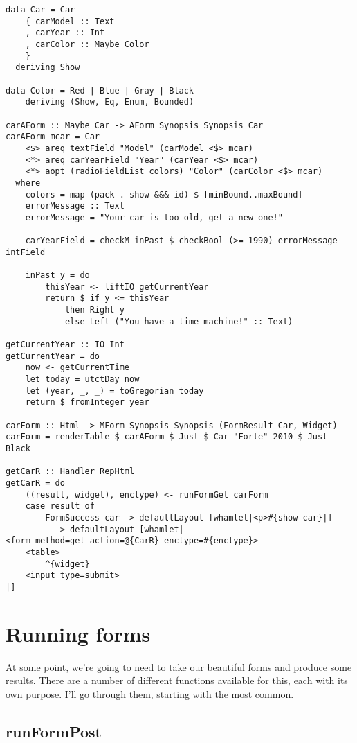 \begin{lstlisting}
data Car = Car
    { carModel :: Text
    , carYear :: Int
    , carColor :: Maybe Color
    }
  deriving Show

data Color = Red | Blue | Gray | Black
    deriving (Show, Eq, Enum, Bounded)

carAForm :: Maybe Car -> AForm Synopsis Synopsis Car
carAForm mcar = Car
    <$> areq textField "Model" (carModel <$> mcar)
    <*> areq carYearField "Year" (carYear <$> mcar)
    <*> aopt (radioFieldList colors) "Color" (carColor <$> mcar)
  where
    colors = map (pack . show &&& id) $ [minBound..maxBound]
    errorMessage :: Text
    errorMessage = "Your car is too old, get a new one!"

    carYearField = checkM inPast $ checkBool (>= 1990) errorMessage intField

    inPast y = do
        thisYear <- liftIO getCurrentYear
        return $ if y <= thisYear
            then Right y
            else Left ("You have a time machine!" :: Text)

getCurrentYear :: IO Int
getCurrentYear = do
    now <- getCurrentTime
    let today = utctDay now
    let (year, _, _) = toGregorian today
    return $ fromInteger year

carForm :: Html -> MForm Synopsis Synopsis (FormResult Car, Widget)
carForm = renderTable $ carAForm $ Just $ Car "Forte" 2010 $ Just Black

getCarR :: Handler RepHtml
getCarR = do
    ((result, widget), enctype) <- runFormGet carForm
    case result of
        FormSuccess car -> defaultLayout [whamlet|<p>#{show car}|]
        _ -> defaultLayout [whamlet|
<form method=get action=@{CarR} enctype=#{enctype}>
    <table>
        ^{widget}
    <input type=submit>
|]
\end{lstlisting}

\section{Running forms}

At some point, we're going to need to take our beautiful forms and produce some results.
There are a number of different functions available for this, each with its own purpose.
I'll go through them, starting with the most common.

\subsection{runFormPost}

